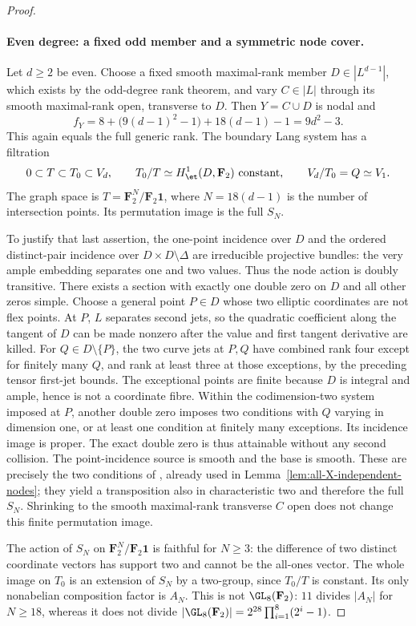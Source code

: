 \begin{proof}
\paragraph{Even degree: a fixed odd member and a symmetric node cover.}
Let $d\ge2$ be even. Choose a fixed smooth maximal-rank member
$D\in|L^{d-1}|$, which exists by the odd-degree rank theorem, and
vary $C\in|L|$ through its smooth maximal-rank open, transverse to $D$.
Then $Y=C\cup D$ is nodal and
\[
 f_Y=8+\bigl(9(d-1)^2-1\bigr)+18(d-1)-1=9d^2-3.
\]
This again equals the full generic rank. The boundary Lang system has
a filtration
\[
 0\subset T\subset T_0\subset V_d,
 \qquad T_0/T\simeq H^1_{\et}(D,\mathbf F_2)\text{ constant},
 \qquad V_d/T_0=Q\simeq V_1.
\]
The graph space is $T=\mathbf F_2^N/\mathbf F_2\mathbf 1$,
where $N=18(d-1)$ is the number of intersection points.
Its permutation image is the full $S_N$.

To justify that last assertion, the one-point incidence over $D$ and
the ordered distinct-pair incidence over $D\times D\setminus\Delta$
are irreducible projective bundles: the very ample embedding separates
one and two values. Thus the node action is doubly transitive.
There exists a section with exactly one double zero on $D$ and all
other zeros simple. Choose a general point $P\in D$ whose two
elliptic coordinates are not flex points. At $P$, $L$ separates
second jets, so the quadratic coefficient along the tangent of $D$
can be made nonzero after the value and first tangent derivative
are killed. For $Q\in D\setminus\{P\}$, the two curve jets at
$P,Q$ have combined rank four except for finitely many $Q$, and
rank at least three at those exceptions, by the preceding tensor
first-jet bounds. The exceptional points are finite because $D$ is
integral and ample, hence is not a coordinate fibre. Within the
codimension-two system imposed at $P$, another double zero imposes
two conditions with $Q$ varying in dimension one, or at least one
condition at finitely many exceptions. Its incidence image is proper.
The exact double zero is thus attainable without any second collision.
The point-incidence source is smooth and the base is smooth.
These are precisely the two conditions of
\cite[Proposition~3.1, arXiv version~3, pp.~7--8]{Entin2021}, already
used in Lemma~\ref{lem:all-X-independent-nodes}; they yield a
transposition also in characteristic two and therefore the full $S_N$.
Shrinking to the smooth maximal-rank transverse $C$ open does not
change this finite permutation image.

The action of $S_N$ on $\mathbf F_2^N/\mathbf F_2\mathbf1$ is
faithful for $N\ge3$: the difference of two distinct coordinate
vectors has support two and cannot be the all-ones vector.
The whole image on $T_0$ is an extension of $S_N$ by a two-group,
since $T_0/T$ is constant. Its only nonabelian composition factor
is $A_N$. This is not $\GL_8(\mathbf F_2)$: $11$ divides $|A_N|$
for $N\ge18$, whereas it does not divide
$|\GL_8(\mathbf F_2)|=2^{28}\prod_{i=1}^8(2^i-1)$.


\end{proof}
